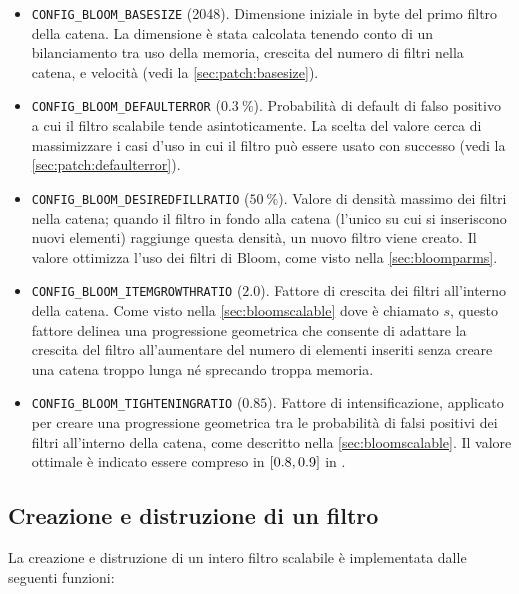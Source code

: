 \medskip
\begin{itemize}
  \item \verb|CONFIG_BLOOM_BASESIZE| (\SI{2048}{\byte}). Dimensione iniziale in byte del primo
  filtro della catena. La dimensione è stata calcolata tenendo conto di un bilanciamento tra uso
  della memoria, crescita del numero di filtri nella catena, e velocità (vedi la
  \autoref{sec:patch:basesize}).

  \item \verb|CONFIG_BLOOM_DEFAULTERROR| ($\SI{0.3}{\percent}$). Probabilità di default di falso
  positivo a cui il filtro scalabile tende asintoticamente. La scelta del valore cerca di
  massimizzare i casi d'uso in cui il filtro può essere usato con successo (vedi la
  \autoref{sec:patch:defaulterror}).

  \item \verb|CONFIG_BLOOM_DESIREDFILLRATIO| ($\SI{50}{\percent}$). Valore di densità massimo dei filtri
  nella catena; quando il filtro in fondo alla catena (l'unico su cui si inseriscono nuovi elementi)
  raggiunge questa densità, un nuovo filtro viene creato. Il valore ottimizza l'uso dei filtri di
  Bloom, come visto nella \autoref{sec:bloomparms}.

  \item \verb|CONFIG_BLOOM_ITEMGROWTHRATIO| ($\num{2.0}$). Fattore di crescita dei filtri
  all'interno della catena. Come visto nella \autoref{sec:bloomscalable} dove è chiamato
  $s$, questo fattore delinea una progressione geometrica che consente di adattare la crescita del
  filtro all'aumentare del numero di elementi inseriti senza creare una catena troppo lunga
  né sprecando troppa memoria.

  \item \verb|CONFIG_BLOOM_TIGHTENINGRATIO| ($\num{0.85}$). Fattore di intensificazione, applicato
  per creare una progressione geometrica tra le probabilità di falsi positivi dei filtri all'interno
  della catena, come descritto nella \autoref{sec:bloomscalable}. Il valore ottimale è indicato
  essere compreso in $\interval{0.8}{0.9}$ in \cite{bloom-scalable}.

\end{itemize}
\medskip

\subsection{Creazione e distruzione di un filtro}

La creazione e distruzione di un intero filtro scalabile è implementata dalle seguenti funzioni:

